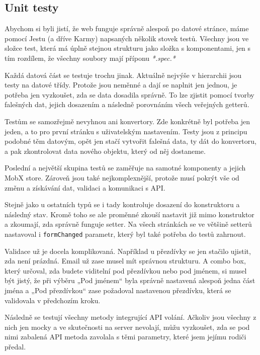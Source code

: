 \subsection{Unit testy}
Abychom si byli jistí, že web funguje správně alespoň po datové stránce, máme pomocí Jestu (a dříve Karmy) napsaných několik stovek testů. Všechny jsou ve složce test, která má úplně stejnou strukturu jako složka s komponentami, jen s tím rozdílem, že všechny soubory mají příponu \textit{*.spec.*}

Každá datová část se testuje trochu jinak. Aktuálně nejvýše v hierarchii jsou testy na datové třídy. Protože jsou neměnné a dají se naplnit jen jednou, je potřeba jen vyzkoušet, zda se data dosadila správně. To lze zjistit pomocí tvorby falešných dat, jejich dosazením a následně porovnáním všech veřejných getterů.

Testům se samozřejmě nevyhnou ani konvertory. Zde konkrétně byl potřeba jen jeden, a to pro první stránku s uživatelským nastavením. Testy jsou z principu podobné těm datovým, opět jen stačí vytvořit falešná data, ty dát do konvertoru, a pak zkontrolovat data nového objektu, který od něj dostaneme.

Poslední a největší skupina testů se zaměřuje na samotné komponenty a jejich MobX store. Zároveň jsou také nejkomplexnější, protože musí pokrýt vše od změnu a získávání dat, validaci a komunikaci s API.

Stejně jako u ostatních typů se i tady kontroluje dosazení do konstruktoru a následný stav. Kromě toho se ale proměnné zkouší nastavit již mimo konstruktor a zkoumají, zda správně funguje setter. Na všech stránkách se ve většině setterů nastavoval i \texttt{formChanged} parametr, který byl také potřeba do testů zahrnout.

Validace už je docela komplikovaná. Například u přezdívky se jen stačilo ujistit, zda není prázdná. Email už zase musel mít správnou strukturu. A combo box, který určoval, zda budete viditelní pod přezdívkou nebo pod jménem, si musel být jistý, že při výběru „Pod jménem“ byla správně nastavená alespoň jedna část jména a „Pod přezdívkou“ zase požadoval nastavenou přezdívku, která se validovala v předchozím kroku.

Následně se testují všechny metody integrující API volání. Ačkoliv jsou všechny z nich jen mocky a ve skutečnosti na server nevolají, můžu vyzkoušet, zda se pod nimi zabalená API metoda zavolala s těmi parametry, které jsem jejímu rodiči předal.